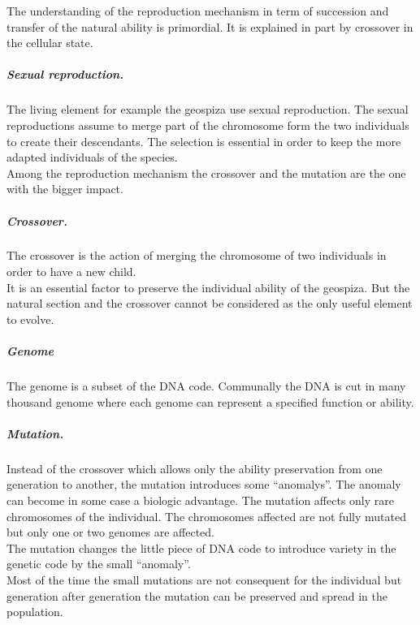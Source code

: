  The understanding of the reproduction mechanism in term of succession and transfer of the natural ability is primordial. It is explained in part by crossover in the cellular state.
 \subparagraph{Sexual reproduction. }
The living element for example the geospiza use sexual reproduction. The sexual reproductions assume to merge  part of the chromosome form the two individuals to create their descendants. The selection is essential in order to keep the more adapted individuals of the species. \\ 
Among the reproduction mechanism the crossover and the mutation are the one with the bigger impact.
\subparagraph{Crossover. }
The crossover is the action of merging the chromosome of two individuals in order to have a new child.\\
It is an essential factor to preserve the individual ability of the geospiza. But the natural section and the crossover cannot be considered as the only useful element to evolve. 
\subparagraph{Genome}
The genome is a subset of the DNA code. Communally the DNA is cut in many thousand genome where each genome can represent a specified function or ability.  
\subparagraph{Mutation. }
Instead of the crossover which allows only the ability preservation from one generation to another, the mutation introduces some “anomalys”. The anomaly can become in some case a biologic advantage.
The mutation affects only rare chromosomes of the individual. The chromosomes affected are not fully mutated but only one or two genomes are affected. \\
The mutation changes the little piece of DNA code to introduce variety in the genetic code by the small “anomaly”.\\
Most of the time the small mutations are not consequent for the individual but generation after generation the mutation can be preserved and spread in the population. \\  



